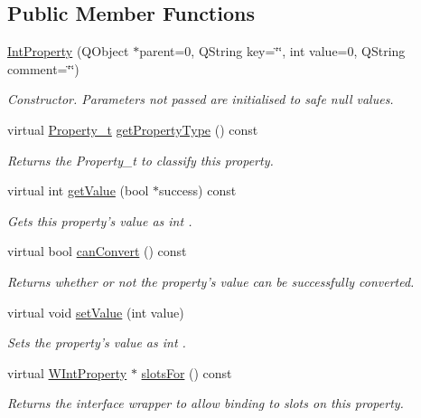 \subsection*{Public Member Functions}
\begin{DoxyCompactItemize}
\item 
\hyperlink{class_int_property_a0ac475dedc13dbe672277438328fa278}{Int\-Property} (Q\-Object $\ast$parent=0, Q\-String key=\char`\"{}\char`\"{}, int value=0, Q\-String comment=\char`\"{}\char`\"{})
\begin{DoxyCompactList}\small\item\em Constructor. Parameters not passed are initialised to safe null values. \end{DoxyCompactList}\item 
virtual \hyperlink{group___property_classes_ga38f1ccddda12c7cb50b868c9f789ee37}{Property\-\_\-t} \hyperlink{class_int_property_a3747830573f747807d40a6cb201b2137}{get\-Property\-Type} () const 
\begin{DoxyCompactList}\small\item\em Returns the Property\-\_\-t to classify this property. \end{DoxyCompactList}\item 
virtual int \hyperlink{class_int_property_a721123bb68dd46f0d0247012b663d4ba}{get\-Value} (bool $\ast$success) const 
\begin{DoxyCompactList}\small\item\em Gets this property's value as int . \end{DoxyCompactList}\item 
virtual bool \hyperlink{class_int_property_a3ce0216893c32bae0bb469fe1f82f83c}{can\-Convert} () const 
\begin{DoxyCompactList}\small\item\em Returns whether or not the property's value can be successfully converted. \end{DoxyCompactList}\item 
virtual void \hyperlink{class_int_property_a9c3b7ced3c8b7d8fbb9f739449e5622e}{set\-Value} (int value)
\begin{DoxyCompactList}\small\item\em Sets the property's value as int . \end{DoxyCompactList}\item 
virtual \hyperlink{class_w_int_property}{W\-Int\-Property} $\ast$ \hyperlink{class_int_property_a2064a016e6cb84275819e4390c7e9a84}{slots\-For} () const 
\begin{DoxyCompactList}\small\item\em Returns the interface wrapper to allow binding to slots on this property. \end{DoxyCompactList}\end{DoxyCompactItemize}

